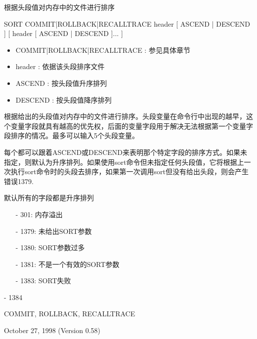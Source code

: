 \label{cmd:sort}

根据头段值对内存中的文件进行排序

SORT COMMIT|ROLLBACK|RECALLTRACE header [ ASCEND | DESCEND ] [ header [ ASCEND | DESCEND ]... ]

\begin{itemize}
\item COMMIT|ROLLBACK|RECALLTRACE : 参见具体章节
\item header : 依据该头段排序文件 
\item ASCEND : 按头段值升序排列 
\item DESCEND : 按头段值降序排列 
\end{itemize}

根据给出的头段值对内存中的文件进行排序。头段变量在命令行中出现的越早，这个变量字段就具有越高的优先权，后面的变量字段用于解决无法根据第一个变量字段排序的情况。最多可以输入5个头段变量。

每个都可以跟着ASCEND或DESCEND来表明那个特定字段的排序方式。如果未指定，则默认为升序排列。如果使用sort命令但未指定任何头段值，它将根据上一次执行sort命令时的头段去排序，如果第一次调用sort但没有给出头段，则会产生错误1379.

默认所有的字段都是升序排列

\begin{itemize}
\item[-]301:  内存溢出
\item[-]1379: 未给出SORT参数
\item[-]1380: SORT参数过多
\item[-]1381: 不是一个有效的SORT参数
\item[-]1383: SORT失败
\end{itemize}

- 1384

COMMIT, ROLLBACK, RECALLTRACE

October 27, 1998 (Version 0.58)

